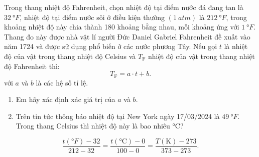 \begin{vd}
	Trong thang nhiệt độ Fahrenheit, chọn nhiệt độ tại điểm nước đá đang tan là $\SI{32}{\degree F}$, nhiệt độ tại điểm nước sôi ở điều kiện thường $\left(\SI{1}{atm}\right)$ là $\SI{212}{\degree F}$, trong khoảng nhiệt độ này chia thành 180 khoảng bằng nhau, mỗi khoảng ứng với $\SI{1}{\degree F}$. Thang đo này được nhà vật lí người Đức Daniel Gabriel Fahrenheit đề xuất vào năm 1724 và được sử dụng phổ biến ở các nước phương Tây. Nếu gọi $t$ là nhiệt độ của vật trong thang nhiệt độ Celsius và $T_\text{F}$ nhiệt độ của vật trong thang nhiệt độ Fahrenheit thì:
	$$T_\text{F}=a\cdot t+b.$$
	với $a$ và $b$ là các hệ số tỉ lệ.
	\begin{enumerate}[label=\alph*)]
		\item Em hãy xác định xác giá trị của $a$ và $b$.
		\item Trên tin tức thông báo nhiệt độ tại New York ngày 17/03/2024 là $\SI{49}{\degree F}$. Trong thang Celsius thì nhiệt độ này là bao nhiêu $\si{\celsius}$?
	\end{enumerate}
\end{vd}
\begin{luuy}
	$$\dfrac{t\left(\si{\degree F}\right)-32}{212-32}=\dfrac{t\left(\si{\celsius}\right)-0}{100-0}=\dfrac{T\left(\si{\kelvin}\right)-273}{373-273}.$$
\end{luuy}
